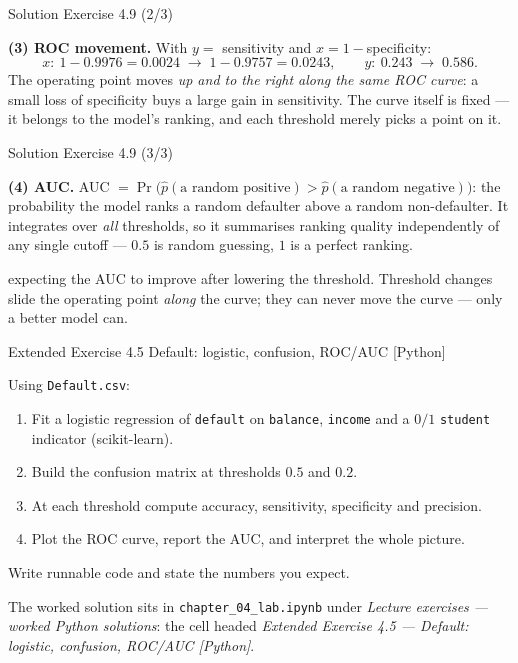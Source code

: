 \documentclass[aspectratio=169,11pt]{beamer}
\begin{document}
\begin{frame}{Solution \textemdash{} Exercise 4.9 (2/3)}
\begin{solutionbox}
\textbf{(3) ROC movement.}
With $y=$ sensitivity and $x=1-$specificity:
\[
  x:\ 1-0.9976=0.0024 \;\to\; 1-0.9757=0.0243, \qquad
  y:\ 0.243 \;\to\; 0.586 .
\]
The operating point moves \emph{up and to the right along the same ROC
curve}: a small loss of specificity buys a large gain in sensitivity.
The curve itself is fixed --- it belongs to the model's ranking, and
each threshold merely picks a point on it.

\vspace{1mm}
\end{solutionbox}
\end{frame}

\begin{frame}{Solution \textemdash{} Exercise 4.9 (3/3)}
\begin{solutionbox}
\textbf{(4) AUC.}
AUC $=\Pr\big(\hat p(\text{a random positive}) >
\hat p(\text{a random negative})\big)$: the probability the model ranks
a random defaulter above a random non-defaulter. It integrates over
\emph{all} thresholds, so it summarises ranking quality independently of
any single cutoff --- $0.5$ is random guessing, $1$ is a perfect
ranking.
\end{solutionbox}
\begin{mistake}
expecting the AUC to improve after lowering the
threshold. Threshold changes slide the operating point \emph{along} the
curve; they can never move the curve --- only a better model can.
\end{mistake}
\end{frame}

\begin{frame}{Extended Exercise 4.5 \textemdash{} Default: logistic, confusion, ROC/AUC [Python]}
\begin{longexercise}
Using \texttt{Default.csv}:
\begin{enumerate}
  \item Fit a logistic regression of \texttt{default} on \texttt{balance},
        \texttt{income} and a $0/1$ \texttt{student} indicator
        (scikit-learn).
  \item Build the confusion matrix at thresholds $0.5$ and $0.2$.
  \item At each threshold compute accuracy, sensitivity, specificity and
        precision.
  \item Plot the ROC curve, report the AUC, and interpret the whole
        picture.
\end{enumerate}
Write runnable code and state the numbers you expect.
\end{longexercise}
\begin{labnote}
  The worked solution sits in \texttt{chapter\_04\_lab.ipynb} under
  \emph{Lecture exercises --- worked Python solutions}: the cell headed
  \emph{Extended Exercise 4.5 --- Default: logistic, confusion, ROC/AUC [Python]}.
\end{labnote}
\end{frame}
\end{document}
